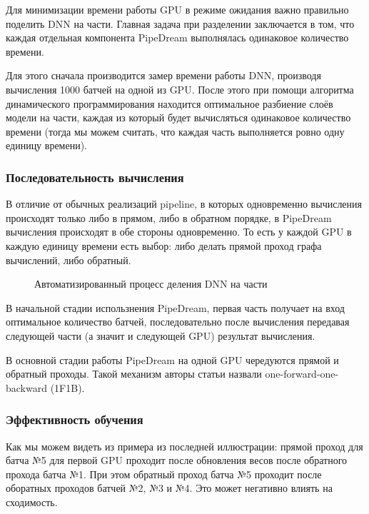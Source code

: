 Для минимизации времени работы GPU в режиме ожидания важно правильно поделить DNN на части. Главная задача при разделении заключается в том, что каждая отдельная компонента PipeDream выполнялась одинаковое количество времени.

Для этого сначала производится замер времени работы DNN, производя вычисления 1000 батчей на одной из GPU. После этого при помощи алгоритма динамического программирования находится оптимальное разбиение слоёв модели на части, каждая из который будет вычисляться одинаковое количество времени (тогда мы можем считать, что каждая часть выполняется ровно одну единицу времени).


\subsubsection{Последовательность вычисления}
В отличие от обычных реализаций pipeline, в которых одновременно вычисления происходят только либо в прямом, либо в обратном порядке, в PipeDream вычисления происходят в обе стороны одновременно. То есть у каждой GPU в каждую единицу времени есть выбор: либо делать прямой проход графа вычислений, либо обратный. 

\begin{figure}[h]%
	\centering
	\caption{Автоматизированный процесс деления DNN на части}
	\label{framework} %
\end{figure}

В начальной стадии использнения PipeDream, первая часть получает на вход оптимальное количество батчей, последовательно после вычисления передавая следующей части (а значит и следующей GPU) результат вычисления. 

В основной стадии работы PipeDream на одной GPU чередуются прямой и обратный проходы. Такой механизм авторы статьи назвали one-forward-one-backward (1F1B).

\subsubsection{Эффективность обучения}
Как мы можем видеть из примера из последней иллюстрации: прямой проход для батча №5 для первой GPU проходит после обновления весов после обратного прохода батча №1. При этом обратный проход батча №5 проходит после оборатных проходов батчей №2, №3 и №4. Это может негативно влиять на сходимость.

